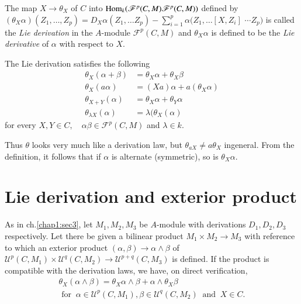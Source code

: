 \begin{defn}\label{chap1:sec4:def3} %
  The map $X \to \theta_X$ of $C$ into $\operatorname{Hom}_k (\mathscr{F}^p(C,M)
  \mathscr{F}^p (C,M))$ defined by $(\theta_X \alpha)(Z_1,  \ldots ,
  Z_p)= D_X \alpha(Z_1,  \ldots Z_p) -
  \sum^p_{i=1} \alpha(Z_1, \ldots [X,Z_i]$ $\cdots Z_p)$ is called the
      {\em Lie derivation} in the $A$-module $\mathscr{F}^p(C,M)$ and
      $\theta_X \alpha$ is defined to be the {\em Lie derivative} of
      $\alpha$ with respect to $X$. 
\end{defn}

The Lie derivation satisfies the following
\begin{align*}
  \theta_X (\alpha +\beta)  &= \theta_X \alpha + \theta_X \beta \\
  \theta_X (a \alpha ) &= (Xa) \alpha +  a (\theta_X \alpha) \\
  \theta_{X+Y}(\alpha)  &= \theta_X \alpha +  \theta_Y \alpha \\
  \theta_{\lambda X}(\alpha) &= \lambda (\theta_X (\alpha)
\end{align*}
for every $X, Y \in C , \quad \alpha \beta \in \mathscr{F}^p(C,M)$ and
$\lambda \in k$. 

Thus $\theta$ looks very much like a derivation  law, but $\theta_{aX}
\neq a \theta_X$ in\pageoriginale general. From  the definition, it follows that if
$\alpha$ is alternate (\resp symme\-tric), so is $\theta_X \alpha$. 

\section{Lie derivation and exterior product}\label{chap1:sec5} %

As in ch.\ref{chap1:sec3}, let $M_1, M_2, M_3$ be $A$-module  with derivations
$D_1, D_2, D_3$ respectively. Let there be given a bilinear product
$M_1 \times M_2 \to M_3$ with reference to which an exterior product
$(\alpha, \beta) \to \alpha \wedge \beta$ of $\mathscr{U}^p
(C,M_1)\times \mathscr{U}^q (C, M_2) \to \mathscr{U}^{p+q} (C, M_3)$
is defined. If the product is compatible with the derivation laws, we
have, on  direct verification, 
\begin{multline*}
\theta_X(\alpha \wedge \beta) = \theta_X \alpha \wedge \beta + \alpha
\wedge \theta_X \beta\\  
\text{ for } ~ \alpha \in \mathscr{U}^p
(C,M_1), \beta \in \mathscr{U}^q(C,M_2) ~ \text{ and } ~ X \in C. 
\end{multline*}

